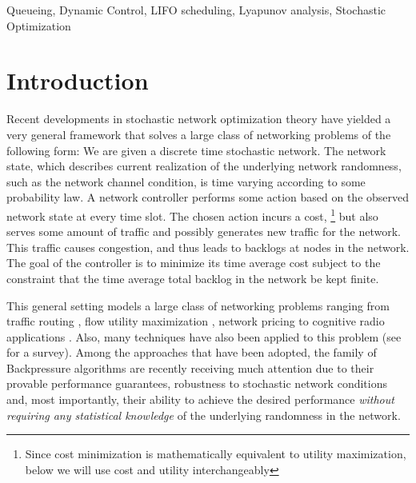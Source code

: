 \documentclass[journal]{IEEEtran}
\begin{document}
\begin{keywords}
Queueing, Dynamic Control, LIFO scheduling, Lyapunov analysis,  Stochastic Optimization
\end{keywords}

\section{Introduction}

Recent developments in stochastic network optimization theory have yielded a very general framework that solves a large class of networking problems of the following form: 
We are given a discrete time stochastic network. The network state, which describes current realization of the underlying network randomness, such as the network channel condition, is time varying according to some probability law. A network controller performs some action based on the observed network state at every time slot. The chosen action incurs a cost, \footnote{Since cost minimization is mathematically equivalent to utility maximization, below we will use cost and utility interchangeably} 
  but also serves some amount of traffic and possibly generates new traffic for the network.  This traffic causes congestion, and thus leads to backlogs at nodes in the network. The goal of the controller is to minimize its time average cost subject to the constraint that the time average total backlog in the network be kept finite. 

This general setting models a large class of networking problems ranging from traffic routing \cite{tassiulas92}, 
flow utility maximization \cite{eryilmaz_qbsc_ton07}, 
network pricing \cite{huangneelypricing} to cognitive radio applications \cite{rahulneelycognitive}. Also,  many techniques have also been applied to this problem (see \cite{yichiang_netopt08} for a survey).  
Among the approaches that have been adopted, the family of Backpressure algorithms \cite{neelynowbook} are recently receiving much attention due to their provable performance guarantees, robustness to stochastic network conditions and, most importantly, their ability to achieve the desired performance \emph{without requiring any statistical knowledge} of the underlying randomness in the network.  
\end{document}
